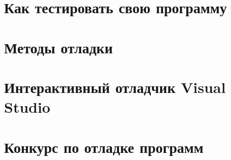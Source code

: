 \documentclass[14pt,openany]{book}
\begin{document}
\begingroup
\hypersetup{linkcolor=black}
\tableofcontents
\endgroup

\clearpage

\chapter{Как тестировать свою программу}

\chapter{Методы отладки}

\chapter{Интерактивный отладчик Visual Studio}

\chapter{Конкурс по отладке программ}
\end{document}
